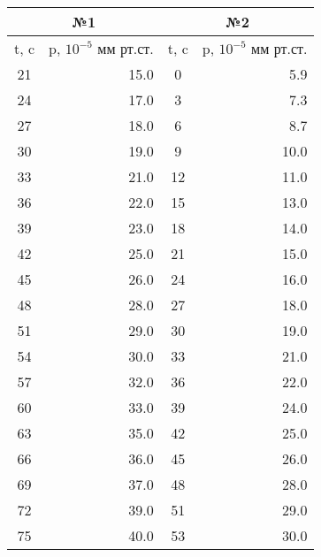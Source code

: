 	\begin{table}[H]
	\centering
\begin{tabular}{|cr||cr|}
\hline
\multicolumn{2}{|c||}{№1}       & \multicolumn{2}{|c|}{№2}       \\ \hline
\multicolumn{1}{|c|}{t, c} & \multicolumn{1}{|c||}{p, $10^{-5}$ мм рт.ст.} & \multicolumn{1}{|c|}{t, c} & \multicolumn{1}{c|}{p, $10^{-5}$ мм рт.ст.} \\ \hline \hline
\multicolumn{1}{|c|}{21}  & 15.0 & \multicolumn{1}{c|}{0}  & 5.9 \\ \hline
\multicolumn{1}{|c|}{24}  & 17.0 & \multicolumn{1}{c|}{3}  & 7.3 \\ \hline
\multicolumn{1}{|c|}{27}  & 18.0 & \multicolumn{1}{c|}{6}  & 8.7 \\ \hline
\multicolumn{1}{|c|}{30}  & 19.0 & \multicolumn{1}{c|}{9}  & 10.0  \\ \hline
\multicolumn{1}{|c|}{33}  & 21.0 & \multicolumn{1}{c|}{12} & 11.0  \\ \hline
\multicolumn{1}{|c|}{36}  & 22.0 & \multicolumn{1}{c|}{15} & 13.0  \\ \hline
\multicolumn{1}{|c|}{39}  & 23.0 & \multicolumn{1}{c|}{18} & 14.0  \\ \hline
\multicolumn{1}{|c|}{42}  & 25.0 & \multicolumn{1}{c|}{21} & 15.0  \\ \hline
\multicolumn{1}{|c|}{45}  & 26.0 & \multicolumn{1}{c|}{24} & 16.0  \\ \hline
\multicolumn{1}{|c|}{48}  & 28.0 & \multicolumn{1}{c|}{27} & 18.0  \\ \hline
\multicolumn{1}{|c|}{51}  & 29.0 & \multicolumn{1}{c|}{30} & 19.0  \\ \hline
\multicolumn{1}{|c|}{54}  & 30.0 & \multicolumn{1}{c|}{33} & 21.0  \\ \hline
\multicolumn{1}{|c|}{57}  & 32.0 & \multicolumn{1}{c|}{36} & 22.0  \\ \hline
\multicolumn{1}{|c|}{60}  & 33.0 & \multicolumn{1}{c|}{39} & 24.0  \\ \hline
\multicolumn{1}{|c|}{63}  & 35.0 & \multicolumn{1}{c|}{42} & 25.0  \\ \hline
\multicolumn{1}{|c|}{66}  & 36.0 & \multicolumn{1}{c|}{45} & 26.0  \\ \hline
\multicolumn{1}{|c|}{69}  & 37.0 & \multicolumn{1}{c|}{48} & 28.0  \\ \hline
\multicolumn{1}{|c|}{72}  & 39.0 & \multicolumn{1}{c|}{51} & 29.0  \\ \hline
\multicolumn{1}{|c|}{75}  & 40.0 & \multicolumn{1}{c|}{53} & 30.0  \\ \hline

\end{tabular}
\end{table}
